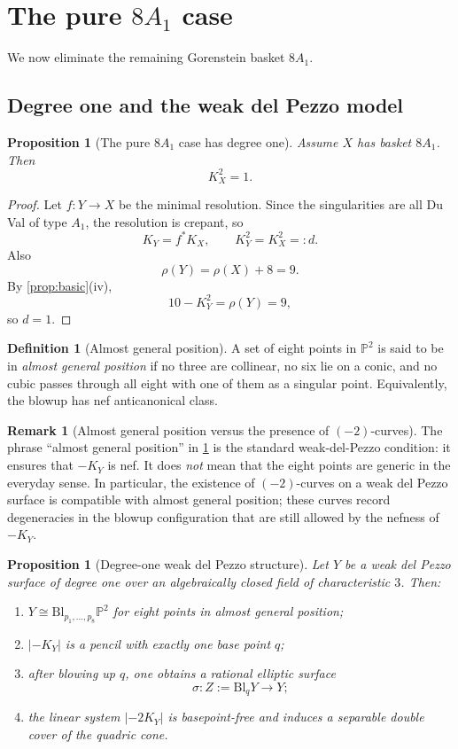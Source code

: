 \documentclass[11pt]{article}
\newtheorem{proposition}[theorem]{Proposition}
\theoremstyle{definition}
\newtheorem{remark}[theorem]{Remark}
\newtheorem{definition}[theorem]{Definition}
\newcommand{\Pbb}{\mathbb P}
\newcommand{\Bl}{\mathrm{Bl}}
\begin{document}
\section{The pure $8A_1$ case}\label{sec:pure8a1}
We now eliminate the remaining Gorenstein basket $8A_1$.

\subsection{Degree one and the weak del Pezzo model}

\begin{proposition}[The pure $8A_1$ case has degree one]\label{prop:8a1-degree-one}
Assume $X$ has basket $8A_1$. Then
\[
K_X^2=1.
\]
\end{proposition}

\begin{proof}
Let $f\colon Y\to X$ be the minimal resolution. Since the singularities are all Du Val of type $A_1$, the resolution is crepant, so
\[
K_Y=f^*K_X,
\qquad
K_Y^2=K_X^2=:d.
\]
Also
\[
\rho(Y)=\rho(X)+8=9.
\]
By \cref{prop:basic}(iv),
\[
10-K_Y^2=\rho(Y)=9,
\]
so $d=1$.
\end{proof}

\begin{definition}[Almost general position]
A set of eight points in $\Pbb^2$ is said to be in \emph{almost general position} if no three are collinear, no six lie on a conic, and no cubic passes through all eight with one of them as a singular point. Equivalently, the blowup has nef anticanonical class.
\end{definition}

\begin{remark}[Almost general position versus the presence of $(-2)$-curves]
The phrase ``almost general position'' in \cref{prop:deg1-weak-dp} is the standard weak-del-Pezzo condition: it ensures that $-K_Y$ is nef. It does \emph{not} mean that the eight points are generic in the everyday sense. In particular, the existence of $(-2)$-curves on a weak del Pezzo surface is compatible with almost general position; these curves record degeneracies in the blowup configuration that are still allowed by the nefness of $-K_Y$.
\end{remark}

\begin{proposition}[Degree-one weak del Pezzo structure]\label{prop:deg1-weak-dp}
Let $Y$ be a weak del Pezzo surface of degree one over an algebraically closed field of characteristic $3$. Then:
\begin{enumerate}[label=\textup{(\roman*)}]
\item $Y\cong \Bl_{p_1,\dots,p_8}\Pbb^2$ for eight points in almost general position;
\item $|-K_Y|$ is a pencil with exactly one base point $q$;
\item after blowing up $q$, one obtains a rational elliptic surface
\[
\sigma\colon Z:=\Bl_qY\to Y;
\]
\item the linear system $|-2K_Y|$ is basepoint-free and induces a separable double cover of the quadric cone.
\end{enumerate}
\end{proposition}
\end{document}
